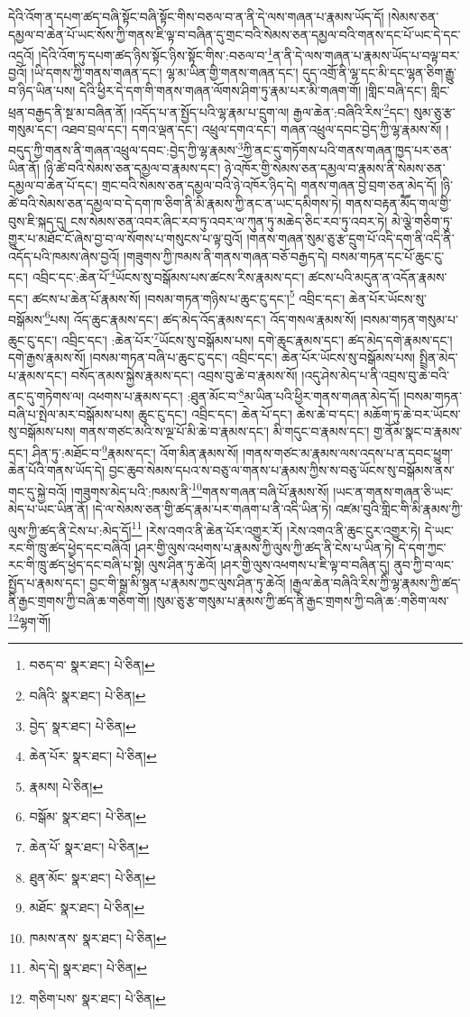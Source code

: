 དེའི་འོག་ན་དཔག་ཚད་བཞི་སྟོང་བཞི་སྟོང་གིས་བཅལ་བ་ན་ནི་དེ་ལས་གཞན་པ་རྣམས་ཡོད་དོ། །སེམས་ཅན་དམྱལ་བ་ཆེན་པོ་ཡང་སོས་ཀྱི་གནས་ཇི་ལྟ་བ་བཞིན་དུ་གྲང་བའི་སེམས་ཅན་དམྱལ་བའི་གནས་དང་པོ་ཡང་དེ་དང་འདྲའོ། །དེའི་འོག་ཏུ་དཔག་ཚད་ཉིས་སྟོང་ཉིས་སྟོང་གིས་:བཅལ་བ་\footnote{བཅད་བ་  སྣར་ཐང་།  པེ་ཅིན། }ན་ནི་དེ་ལས་གཞན་པ་རྣམས་ཡོད་པ་བལྟ་བར་བྱའོ། །ཡི་དགས་ཀྱི་གནས་གཞན་དང་། ལྷ་མ་ཡིན་གྱི་གནས་གཞན་དང་། དུད་འགྲོ་ནི་ལྷ་དང་མི་དང་ལྷན་ཅིག་རྒྱུ་བ་ཉིད་ཡིན་པས། དེའི་ཕྱིར་དེ་དག་གི་གནས་གཞན་ལོགས་ཤིག་ཏུ་རྣམ་པར་མི་གཞག་གོ། །གླིང་བཞི་དང་། གླིང་ཕྲན་བརྒྱད་ནི་སྔ་མ་བཞིན་ནོ། །འདོད་པ་ན་སྤྱོད་པའི་ལྷ་རྣམ་པ་དྲུག་ལ། རྒྱལ་ཆེན་:བཞིའི་རིས་\footnote{བཞིའི་  སྣར་ཐང་།  པེ་ཅིན། }དང་། སུམ་ཅུ་རྩ་གསུམ་དང་། འཐབ་བྲལ་དང་། དགའ་ལྡན་དང་། འཕྲུལ་དགའ་དང་། གཞན་འཕྲུལ་དབང་བྱེད་ཀྱི་ལྷ་རྣམས་སོ། །བདུད་ཀྱི་གནས་ནི་གཞན་འཕྲུལ་དབང་:བྱེད་ཀྱི་ལྷ་རྣམས་\footnote{བྱེད་  སྣར་ཐང་།  པེ་ཅིན། }ཀྱི་ནང་དུ་གཏོགས་པའི་གནས་གཞན་ཁྱད་པར་ཅན་ཡིན་ནོ། །ཉི་ཚེ་བའི་སེམས་ཅན་དམྱལ་བ་རྣམས་དང་། ཉེ་འཁོར་གྱི་སེམས་ཅན་དམྱལ་བ་རྣམས་ནི་སེམས་ཅན་དམྱལ་བ་ཆེན་པོ་དང་། གྲང་བའི་སེམས་ཅན་དམྱལ་བའི་ཉེ་འཁོར་ཉིད་དེ། གནས་གཞན་བྱེ་བྲག་ཅན་མེད་དོ། །ཉི་ཚེ་བའི་སེམས་ཅན་དམྱལ་བ་དེ་དག་ཁ་ཅིག་ནི་མི་རྣམས་ཀྱི་ནང་ན་ཡང་དམིགས་ཏེ། གནས་བརྟན་མཽད་གལ་གྱི་བུས་ཇི་སྐད་དུ། ངས་སེམས་ཅན་འབར་ཞིང་རབ་ཏུ་འབར་ལ་ཀུན་ཏུ་མཆེད་ཅིང་རབ་ཏུ་འབར་ཏེ། མེ་ལྕེ་གཅིག་ཏུ་གྱུར་པ་མཐོང་ངོ་ཞེས་བྱ་བ་ལ་སོགས་པ་གསུངས་པ་ལྟ་བུའོ། །གནས་གཞན་སུམ་ཅུ་རྩ་དྲུག་པོ་འདི་དག་ནི་འདི་ནི་འདོད་པའི་ཁམས་ཞེས་བྱའོ། །གཟུགས་ཀྱི་ཁམས་ནི་གནས་གཞན་བཅོ་བརྒྱད་དེ། བསམ་གཏན་དང་པོ་ཆུང་ངུ་དང་། འབྲིང་དང་:ཆེན་པོ་\footnote{ཆེན་པོར་  སྣར་ཐང་།  པེ་ཅིན། }ཡོངས་སུ་བསྒོམས་པས་ཚངས་རིས་རྣམས་དང་། ཚངས་པའི་མདུན་ན་འདོན་རྣམས་དང་། ཚངས་པ་ཆེན་པོ་རྣམས་སོ། །བསམ་གཏན་གཉིས་པ་ཆུང་ངུ་དང་།\footnote{རྣམས།  པེ་ཅིན། } འབྲིང་དང་། ཆེན་པོར་ཡོངས་སུ་བསྒོམས་\footnote{བསྒོམ་  སྣར་ཐང་།  པེ་ཅིན། }པས། འོད་ཆུང་རྣམས་དང་། ཚད་མེད་འོད་རྣམས་དང་། འོད་གསལ་རྣམས་སོ། །བསམ་གཏན་གསུམ་པ་ཆུང་ངུ་དང་། འབྲིང་དང་། :ཆེན་པོར་\footnote{ཆེན་པོ་  སྣར་ཐང་།  པེ་ཅིན། }ཡོངས་སུ་བསྒོམས་པས། དགེ་ཆུང་རྣམས་དང་། ཚད་མེད་དགེ་རྣམས་དང་། དགེ་རྒྱས་རྣམས་སོ། །བསམ་གཏན་བཞི་པ་ཆུང་ངུ་དང་། འབྲིང་དང་། ཆེན་པོར་ཡོངས་སུ་བསྒོམས་པས། སྤྲིན་མེད་པ་རྣམས་དང་། བསོད་ནམས་སྐྱེས་རྣམས་དང་། འབྲས་བུ་ཆེ་བ་རྣམས་སོ། །འདུ་ཤེས་མེད་པ་ནི་འབྲས་བུ་ཆེ་བའི་ནང་དུ་གཏེགས་ལ། འཕགས་པ་རྣམས་དང་། :ཐུན་མོང་བ་\footnote{ཐུན་མོང་  སྣར་ཐང་།  པེ་ཅིན། }མ་ཡིན་པའི་ཕྱིར་གནས་གཞན་མེད་དོ། །བསམ་གཏན་བཞི་པ་སྤེལ་མར་བསྒོམས་པས། ཆུང་ངུ་དང་། འབྲིང་དང་། ཆེན་པོ་དང་། ཆེས་ཆེ་བ་དང་། མཆོག་ཏུ་ཆེ་བར་ཡོངས་སུ་བསྒོམས་པས། གནས་གཙང་མའི་ས་ལྔ་པོ་མི་ཆེ་བ་རྣམས་དང་། མི་གདུང་བ་རྣམས་དང་། གྱ་ནོམ་སྣང་བ་རྣམས་དང་། ཤིན་ཏུ་:མཐོང་བ་\footnote{མཐོང་  སྣར་ཐང་།  པེ་ཅིན། }རྣམས་དང་། འོག་མིན་རྣམས་སོ། །གནས་གཙང་མ་རྣམས་ལས་འདས་པ་ན་དབང་ཕྱུག་ཆེན་པོའི་གནས་ཡོད་དེ། བྱང་ཆུབ་སེམས་དཔའ་ས་བཅུ་ལ་གནས་པ་རྣམས་ཀྱིས་ས་བཅུ་ཡོངས་སུ་བསྒོམས་ནས་གང་དུ་སྐྱེ་བའོ། །གཟུགས་མེད་པའི་:ཁམས་ནི་\footnote{ཁམས་ནས་  སྣར་ཐང་།  པེ་ཅིན། }གནས་གཞན་བཞི་པོ་རྣམས་སོ། །ཡང་ན་གནས་གཞན་ཅི་ཡང་མེད་པ་ཡང་ཡིན་ནོ། །དེ་ལ་སེམས་ཅན་གྱི་ཚད་རྣམ་པར་གཞག་པ་ནི་འདི་ཡིན་ཏེ། འཛམ་བུའི་གླིང་གི་མི་རྣམས་ཀྱི་ལུས་ཀྱི་ཚད་ནི་ངེས་པ་:མེད་དོ།\footnote{མེད་དེ།  སྣར་ཐང་།  པེ་ཅིན། } །རེས་འགའ་ནི་ཆེན་པོར་འགྱུར་རོ། །རེས་འགའ་ནི་ཆུང་ངུར་འགྱུར་ཏེ། དེ་ཡང་རང་གི་ཁྲུ་ཚད་ཕྱེད་དང་བཞིའོ། །ཤར་གྱི་ལུས་འཕགས་པ་རྣམས་ཀྱི་ལུས་ཀྱི་ཚད་ནི་ངེས་པ་ཡིན་ཏེ། དེ་དག་ཀྱང་རང་གི་ཁྲུ་ཚད་ཕྱེད་དང་བཞི་པ་སྟེ། ལུས་ཤིན་ཏུ་ཆེའོ། །ཤར་གྱི་ལུས་འཕགས་པ་ཇི་ལྟ་བ་བཞིན་དུ། ནུབ་ཀྱི་བ་ལང་སྤྱོད་པ་རྣམས་དང་། བྱང་གི་སྒྲ་མི་སྙན་པ་རྣམས་ཀྱང་ལུས་ཤིན་ཏུ་ཆེའོ། །རྒྱལ་ཆེན་བཞིའི་རིས་ཀྱི་ལྷ་རྣམས་ཀྱི་ཚད་ནི་རྒྱང་གྲགས་ཀྱི་བཞི་ཆ་གཅིག་གོ། །སུམ་ཅུ་རྩ་གསུམ་པ་རྣམས་ཀྱི་ཚད་ནི་རྒྱང་གྲགས་ཀྱི་བཞི་ཆ་:གཅིག་ལས་\footnote{གཅིག་པས་  སྣར་ཐང་།  པེ་ཅིན། }ལྷག་གོ། 